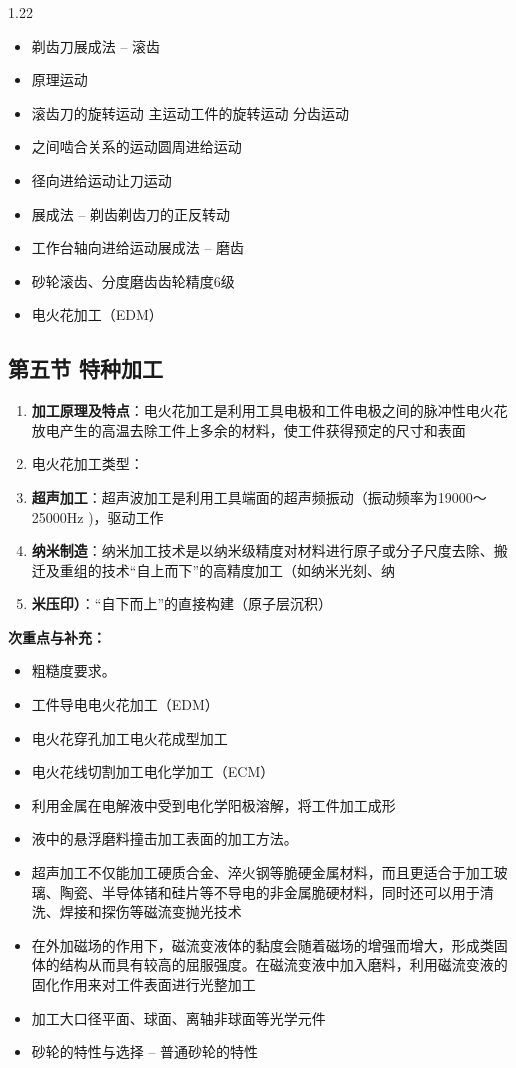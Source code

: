 \documentclass[12pt,a4paper]{article}
\begin{document}
\begin{spacing}{1.22}
\begin{itemize}[leftmargin=2.2em,label=--]
  \item 剃齿刀展成法 – 滚齿
  \item 原理运动
  \item 滚齿刀的旋转运动 主运动工件的旋转运动 分齿运动
  \item 之间啮合关系的运动圆周进给运动
  \item 径向进给运动让刀运动
  \item 展成法 – 剃齿剃齿刀的正反转动
  \item 工作台轴向进给运动展成法 – 磨齿
  \item 砂轮滚齿、分度磨齿齿轮精度6级
  \item 电火花加工（EDM）
\end{itemize}

\subsection{第五节 特种加工}
\begin{tcolorbox}[colback=yellow!6,colframe=red!55!black,title=重点,left=1mm,right=1mm]
\begin{enumerate}[leftmargin=2.2em,label=\arabic*.]
  \item \textbf{加工原理及特点}：电火花加工是利用工具电极和工件电极之间的脉冲性电火花放电产生的高温去除工件上多余的材料，使工件获得预定的尺寸和表面
  \item 电火花加工类型：
  \item \textbf{超声加工}：超声波加工是利用工具端面的超声频振动（振动频率为19000～25000Hz )，驱动工作
  \item \textbf{纳米制造}：纳米加工技术是以纳米级精度对材料进行原子或分子尺度去除、搬迁及重组的技术“自上而下”的高精度加工（如纳米光刻、纳
  \item \textbf{米压印）}：“自下而上”的直接构建（原子层沉积）
\end{enumerate}
\end{tcolorbox}
\noindent\textbf{次重点与补充：}
\begin{itemize}[leftmargin=2.2em,label=--]
  \item 粗糙度要求。
  \item 工件导电电火花加工（EDM）
  \item 电火花穿孔加工电火花成型加工
  \item 电火花线切割加工电化学加工（ECM）
  \item 利用金属在电解液中受到电化学阳极溶解，将工件加工成形
  \item 液中的悬浮磨料撞击加工表面的加工方法。
  \item 超声加工不仅能加工硬质合金、淬火钢等脆硬金属材料，而且更适合于加工玻璃、陶瓷、半导体锗和硅片等不导电的非金属脆硬材料，同时还可以用于清洗、焊接和探伤等磁流变抛光技术
  \item 在外加磁场的作用下，磁流变液体的黏度会随着磁场的增强而增大，形成类固体的结构从而具有较高的屈服强度。在磁流变液中加入磨料，利用磁流变液的固化作用来对工件表面进行光整加工
  \item 加工大口径平面、球面、离轴非球面等光学元件
  \item 砂轮的特性与选择 – 普通砂轮的特性
\end{itemize}


\end{spacing}
\end{document}
